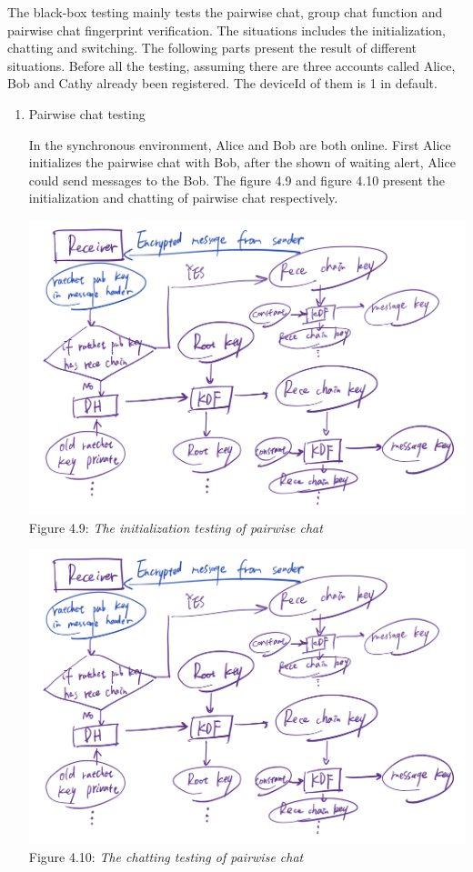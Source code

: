 The black-box testing mainly tests the pairwise chat, group chat function and pairwise chat fingerprint verification. The situations includes the initialization, chatting and switching. The following parts present the result of different situations. Before all the testing, assuming there are three accounts called Alice, Bob and Cathy already been registered. The deviceId of them is 1 in default.

\begin{enumerate}[label=(\roman*)]
\item Pairwise chat testing

In the synchronous environment, Alice and Bob are both online. First Alice initializes the pairwise chat with Bob, after the shown of waiting alert, Alice could send messages to the Bob. The figure 4.9 and figure 4.10 present the initialization and chatting of pairwise chat respectively.

\begin{center}
\includegraphics[scale=.5]{../3-Background/resources/DH-rece.png}\\
Figure 4.9: \textit{The initialization testing of pairwise chat}
\end{center}

\begin{center}
\includegraphics[scale=.5]{../3-Background/resources/DH-rece.png}\\
Figure 4.10: \textit{The chatting testing of pairwise chat}
\end{center}


\end{enumerate}
